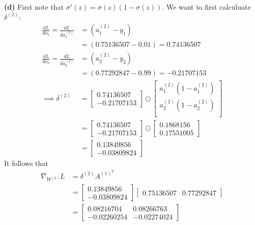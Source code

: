 \documentclass[a4paper, 12pt]{article}
\begin{document}
\begin{solution}
    \textbf{(d)} First note that $\sigma'(z) = \sigma(z)(1-\sigma(z))$. We want to first calculuate $\delta^{(2)}$:
    \begin{align*}
    \frac{dL}{do_1} = \frac{dL}{da^{(2)}_1} &= (a^{(2)}_1 - y_1) \\
    &= (0.75136507 - 0.01) = 0.74136507 \\
    \frac{dL}{do_2} = \frac{dL}{da^{(2)}_2} &= (a^{(2)}_2 - y_2) \\
    &= ( 0.77292847 - 0.99) = -0.21707153 \\
    \implies \delta^{(2)} &= \begin{bmatrix}
        0.74136507 \\
        -0.21707153
    \end{bmatrix} \odot \begin{bmatrix}
        a^{(2)}_1 (1 - a^{(2)}_1) \\
        a^{(2)}_2 (1 - a^{(2)}_2) \\
    \end{bmatrix} \\
    &= \begin{bmatrix}
        0.74136507 \\
        -0.21707153
    \end{bmatrix} \odot \begin{bmatrix}
        0.1868156  \\ 0.17551005
    \end{bmatrix} \\
    &=\begin{bmatrix}
        0.13849856 \\
        -0.03809824
    \end{bmatrix}
    \end{align*}
    It follows that \begin{align*}
    \nabla_{W^{(2)}}L &= \delta^{(2)} A^{(1)^T} \\
    &= \begin{bmatrix}
        0.13849856 \\
        -0.03809824
    \end{bmatrix}
    \begin{bmatrix}
        0.75136507 & 0.77292847
    \end{bmatrix} \\
    &= \begin{bmatrix}
        0.08216704 &  0.08266763 \\
        -0.02260254  & -0.02274024
    \end{bmatrix}
    \end{align*}

\end{solution}
\end{document}
